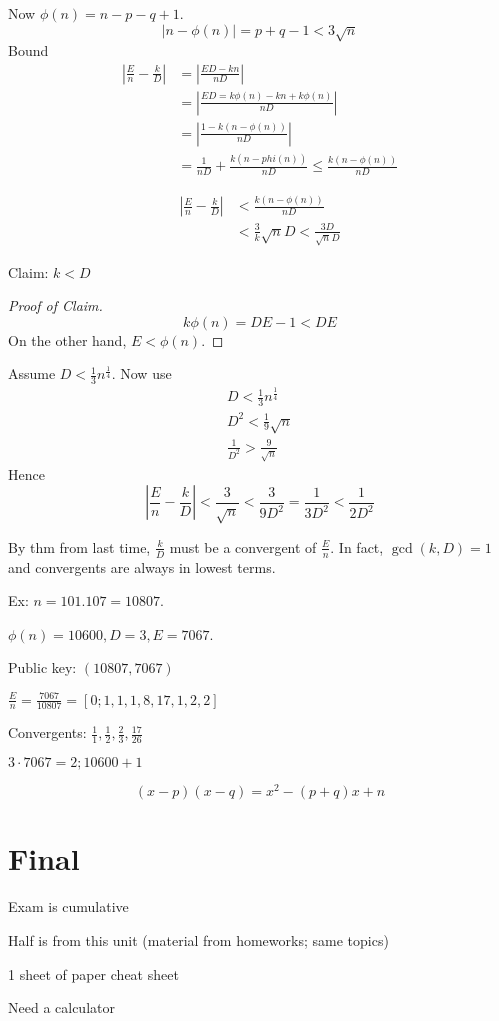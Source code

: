     Now $\phi(n) = n-p-q+1$. 
    \[
        |n-\phi(n)| = p+q-1 < 3\sqrt{n}
    \]
    Bound 
    \begin{align*}
        |\frac{E}{n} -\frac{k}{D}| &= |\frac{ED-kn}{nD}| \\
        &= |\frac{ED = k\phi(n) - kn + k\phi(n)}{nD}| \\
        &= |\frac{1-k(n-\phi(n))}{nD}| \\
        &= \frac{1}{nD} + \frac{k(n-phi(n))}{nD} \le \frac{k(n-\phi(n))}{nD}
    \end{align*}

    \begin{align*}
        |\frac{E}{n} -\frac{k}{D}| &< \frac{k(n-\phi(n))}{nD} \\
        &< \frac3{k}{\sqrt{n}D} < \frac{3D}{\sqrt{n}D}
    \end{align*}

    Claim: $k < D$
    \begin{proof} [Proof of Claim]
        \[
            k\phi(n) = DE-1 < DE
        \]
        On the other hand, $E<\phi(n)$.
    \end{proof}

    Assume $D < \frac{1}{3}n^{\frac{1}{4}}$. Now use
    \begin{align*}
        D < \frac{1}{3}n^{\frac{1}{4}} \\
        D^2 < \frac{1}{9}\sqrt{n} \\
        \frac{1}{D^2} > \frac{9}{\sqrt{n}} 
    \end{align*}
    Hence 
    \[
        |\frac{E}{n} - \frac{k}{D}| < \frac{3}{\sqrt{n}} < \frac{3}{9D^2} = \frac{1}{3D^2} < \frac{1}{2D^2}
    \]

    By thm from last time, $\frac{k}{D}$ must be a convergent of $\frac{E}{n}$. 
    In fact, $\gcd(k, D) = 1$ and convergents are always in lowest terms. 

    Ex: $n = 101. 107 = 10807$. 

    $\phi(n) = 10600, D = 3, E = 7067$. 

    Public key: $(10807, 7067)$

    $\frac{E}{n} = \frac{7067}{10807} = [0;1,1,1,8,17,1,2,2]$

    Convergents: $\frac{1}{1}, \frac{1}{2}, \frac{2}{3}, \frac{17}{26}$

    $3\cdot 7067 = 2; 10600 + 1$

    \[
        (x-p)(x-q) = x^2 - (p+q)x + n
    \]

\section{Final}
    Exam is cumulative 

    Half is from this unit (material from homeworks; same topics)

    1 sheet of paper cheat sheet 

    Need a calculator